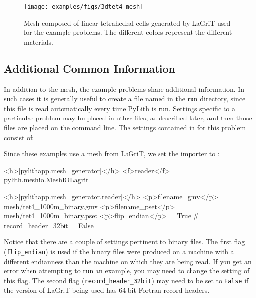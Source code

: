 \begin{figure}
  \texttt{[image: examples/figs/3dtet4\_mesh]}
  \caption{Mesh composed of linear tetrahedral cells generated by
    LaGriT used for the example problems. The different colors
    represent the different materials.}
  \label{fig:3dtet4:mesh}
\end{figure}


\subsection{Additional Common Information}

In addition to the mesh, the example problems share additional information.
In such cases it is generally useful to create a file named 
in the run directory, since this file is read automatically every
time PyLith is run. Settings specific to a particular problem may
be placed in other  files, as described later, and then
those files are placed on the command line.  The settings contained
in  for this problem consist of:
\begin{inventory}
\end{inventory}
Since these examples use a mesh from LaGriT, we set the importer to
:
\begin{cfg}
<h>[pylithapp.mesh_generator]</h>
<f>reader</f> = pylith.meshio.MeshIOLagrit

<h>[pylithapp.mesh_generator.reader]</h>
<p>filename_gmv</p> = mesh/tet4_1000m_binary.gmv
<p>filename_pset</p> = mesh/tet4_1000m_binary.pset
<p>flip_endian</p> = True
# record_header_32bit = False
\end{cfg}
Notice that there are a couple of settings pertinent to binary files.
The first flag (\texttt{flip\_endian}) is used if the binary files
were produced on a machine with a different endianness than the machine
on which they are being read. If you get an error when attempting
to run an example, you may need to change the setting of this flag.
The second flag (\texttt{record\_header\_32bit}) may need to be set
to \texttt{False} if the version of LaGriT being used has 64-bit Fortran
record headers. 


